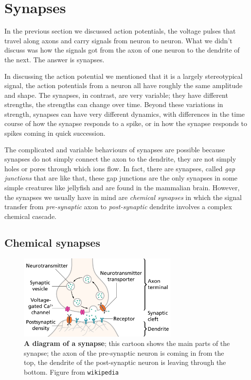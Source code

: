 \documentclass[12pt]{article}
\begin{document}
\section*{Synapses}

In the previous section we discussed action potentials, the voltage
pulses that travel along axons and carry signals from neuron to
neuron. What we didn't discuss was how the signals got from the axon
of one neuron to the dendrite of the next. The answer is synapses. 

In discussing the action potential we mentioned that it is a largely
stereotypical signal, the action potentials from a neuron all have
roughly the same amplitude and shape. The synapses, in contrast, are
very variable; they have different strengths, the strengths can change
over time. Beyond these variations in strength, synapses can have very
different dynamics, with differences in the time course of how the
synapse responds to a spike, or in how the synapse responds to spikes
coming in quick succession.

The complicated and variable behaviours of synapses are possible
because synapses do not simply connect the axon to the dendrite, they
are not simply holes or pores through which ions flow. In fact, there
are synapses, called \textsl{gap junctions} that are like that, these
gap junctions are the only synapses in some simple creatures like
jellyfish and are found in the mammalian brain. However, the synapses
we usually have in mind are \textsl{chemical synapses} in which the
signal transfer from \textsl{pre-synaptic} axon to
\textsl{post-synaptic} dendrite involves a complex chemical cascade.


\subsection*{Chemical synapses} 

\begin{figure}[tbhp]
  \begin{center}
    \includegraphics[width=8cm]{synapse.png}
    \end{center}
  \caption{\textbf{A diagram of a synapse}; this cartoon shows the
    main parts of the synapse; the axon of the pre-synaptic neuron is
    coming in from the top, the dendrite of the post-synaptic neuron
    is leaving through the bottom. Figure from
    \texttt{wikipedia}\label{fig_synapse}}
\end{figure}
\end{document}

